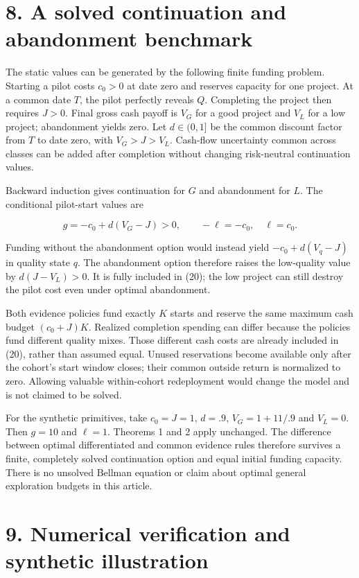 \documentclass[
  11pt,
]{article}
\begin{document}
\section{8. A solved continuation and abandonment
benchmark}\label{a-solved-continuation-and-abandonment-benchmark}

The static values can be generated by the following finite funding
problem. Starting a pilot costs \(c_0>0\) at date zero and reserves
capacity for one project. At a common date \(T\), the pilot perfectly
reveals \(Q\). Completing the project then requires \(J>0\). Final gross
cash payoff is \(V_G\) for a good project and \(V_L\) for a low project;
abandonment yields zero. Let \(d\in(0,1]\) be the common discount factor
from \(T\) to date zero, with \(V_G>J>V_L\). Cash-flow uncertainty
common across classes can be added after completion without changing
risk-neutral continuation values.

Backward induction gives continuation for \(G\) and abandonment for
\(L\). The conditional pilot-start values are

\[g=-c_0+d(V_G-J)>0,\qquad -\ell=-c_0,\quad\ell=c_0. \tag{20}\]

Funding without the abandonment option would instead yield
\(-c_0+d(V_q-J)\) in quality state \(q\). The abandonment option
therefore raises the low-quality value by \(d(J-V_L)>0\). It is fully
included in (20); the low project can still destroy the pilot cost even
under optimal abandonment.

Both evidence policies fund exactly \(K\) starts and reserve the same
maximum cash budget \((c_0+J)K\). Realized completion spending can
differ because the policies fund different quality mixes. Those
different cash costs are already included in (20), rather than assumed
equal. Unused reservations become available only after the cohort's
start window closes; their common outside return is normalized to zero.
Allowing valuable within-cohort redeployment would change the model and
is not claimed to be solved.

For the synthetic primitives, take \(c_0=J=1\), \(d=.9\),
\(V_G=1+11/.9\) and \(V_L=0\). Then \(g=10\) and \(\ell=1\). Theorems 1
and 2 apply unchanged. The difference between optimal differentiated and
common evidence rules therefore survives a finite, completely solved
continuation option and equal initial funding capacity. There is no
unsolved Bellman equation or claim about optimal general exploration
budgets in this article.

\section{9. Numerical verification and synthetic
illustration}\label{numerical-verification-and-synthetic-illustration}
\end{document}
